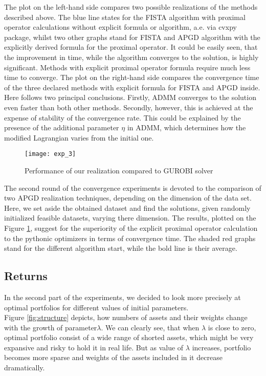 \documentclass[a4paper]{article}
\begin{document}
\noindent The plot on the left-hand side compares two possible realizations of the methods described above. The blue line states for the FISTA algorithm with proximal operator calculations without explicit formula or algorithm, a.e. via cvxpy package, whilst two other graphs stand for FISTA and APGD algorithm with the explicitly derived formula for the proximal operator. It could be easily seen, that the improvement in time, while the algorithm converges to the solution, is highly significant. Methods with explicit proximal operator formula require much less time to converge.\newline
The plot on the right-hand side compares the convergence time of the three declared methods with explicit formula for FISTA and APGD inside. Here follows two principal conclusions. Firstly, ADMM converges to the solution even faster than both other methods. Secondly, however, this is achieved at the expense of stability of the convergence rate. This could be explained by the presence of the additional parameter $\eta$ in ADMM, which determines how the modified Lagrangian varies from the initial one.

\begin{figure}[!h]
\centering
  \texttt{[image: exp\_3]}
\caption{\label{fig:vsgurobi}Performance of our realization compared to GUROBI solver}
\end{figure}

\noindent The second round of the convergence experiments is devoted to the comparison of two APGD realization techniques, depending on the dimension of the data set. Here, we set aside the obtained dataset and find the solutions, given randomly initialized feasible datasets, varying there dimension. The results, plotted on the Figure \ref{fig:vsgurobi}, suggest for the superiority of the explicit proximal operator calculation to the pythonic optimizers in terms of convergence time. The shaded red graphs stand for the different algorithm start, while the bold line is their average.

\subsection{Returns}
In the second part of the experiments, we decided to look more precisely at optimal portfolios for different values of initial parameters. \\
Figure \ref{fig:structure} depicts, how numbers of assets and their weights change with the growth of parameter$\lambda$. We can clearly see, that when $\lambda$ is close to zero, optimal portfolio consist of a wide range of shorted assets, which might be very expansive and risky to hold it in real life. But as value of $\lambda$ increases, portfolio becomes more sparse and weights of the assets included in it decrease dramatically.
\end{document}
